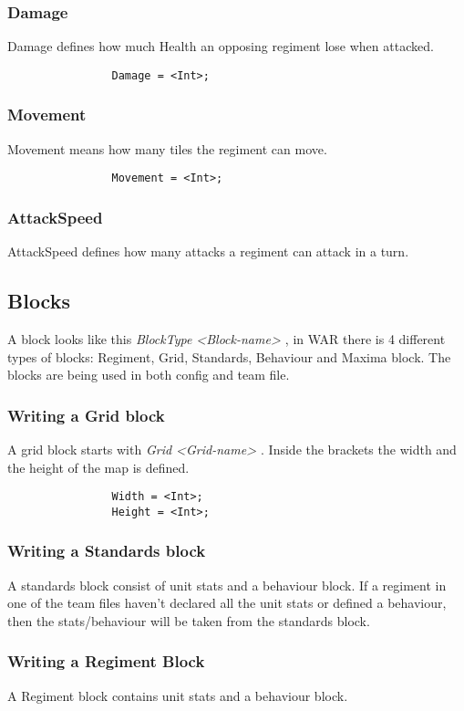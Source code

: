 		\subsubsection{Damage}
			Damage defines how much Health an opposing regiment lose when attacked.
			\begin{verbatim}
				Damage = <Int>;
			\end{verbatim}
		\subsubsection{Movement}
			Movement means how many tiles the regiment can move.
			\begin{verbatim}
				Movement = <Int>;
			\end{verbatim}
		\subsubsection{AttackSpeed}
			AttackSpeed defines how many attacks a regiment can attack in a turn.
	\subsection{Blocks}
		A block looks like this {\it BlockType <Block-name> { } }, in WAR there is 4 different types of blocks: 
		Regiment, Grid, Standards, Behaviour and Maxima block. The blocks are being used in both config and team file.
		\subsubsection{Writing a Grid block}
			A grid block starts with {\it Grid <Grid-name> { }}. Inside the brackets the width and the height of the map is defined.
			\begin{verbatim}
				Width = <Int>;
				Height = <Int>;
			\end{verbatim}	
			
		\subsubsection{Writing a Standards block}
			A standards block consist of unit stats and a behaviour block. If a regiment in one of the team files haven't declared all the unit stats
			or defined a behaviour, then the stats/behaviour will be taken from the standards block.
		\subsubsection{Writing a Regiment Block}
			A Regiment block contains unit stats and a behaviour block.
